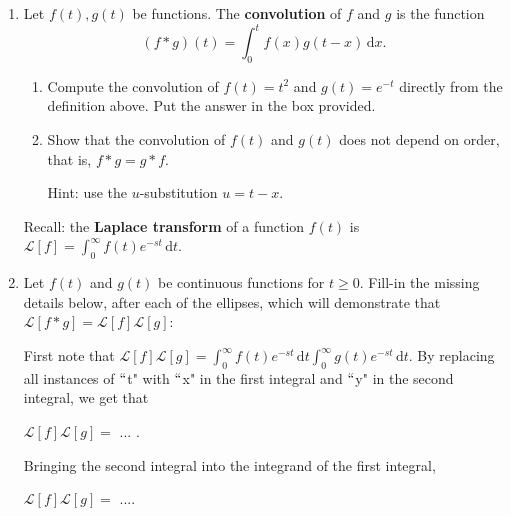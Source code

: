 \documentclass{ximera}
\begin{document}
\begin{enumerate}
\item Let $f(t),g(t)$ be functions.  The \textbf{convolution} of $f$ and $g$ is the function $$\displaystyle (f\ast g)(t)=\int_{0}^{t}f(x)g(t-x)\,\mathrm{d}x.$$

\begin{enumerate}

\item  Compute the convolution of $f(t)=t^2$ and $g(t)=e^{-t}$ directly from the definition above.  Put the answer in the box provided.

\hfill{}\fbox{ \begin{minipage}{4in}\vspace{0.3in} \hfill\vspace{0.3in} \end{minipage} }

\vfill

\item Show that the convolution of $f(t)$ and $g(t)$ does not depend on order, that is, $f\ast g=g\ast f$.  

Hint:  use the $u$-substitution $u=t-x$.

\vfill


\end{enumerate}


\newpage


Recall: the \textbf{Laplace transform} of a function $f(t)$ is $\displaystyle \mathcal{L}[f]=\int_{0}^{\infty}f(t)e^{-st}\,\mathrm{d}t$.

\item  Let $f(t)$ and $g(t)$ be continuous functions for $t\geq 0$.  Fill-in the missing details below, after each of the ellipses, which will demonstrate that\\ $\mathcal{L}[f\ast g]=\mathcal{L}[f]\mathcal{L}[g]$:


First note that $\displaystyle \mathcal{L}[f]\mathcal{L}[g]=\int_0^{\infty}f(t)e^{-st}\,\mathrm{d}t\int_0^{\infty}g(t)e^{-st}\,\mathrm{d}t$.  By replacing all instances of $``$t" with $``$x" in the first integral and $``$y" in the second integral, we get that


\vfill

$\displaystyle \mathcal{L}[f]\mathcal{L}[g]=$ ... \hfill.

\vfill

Bringing the second integral into the integrand of the first integral, 

\vfill

$\displaystyle \mathcal{L}[f]\mathcal{L}[g]=$ ...\hfill.  


\end{enumerate}
\end{document}
